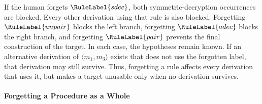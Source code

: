 If the human forgets $\RuleLabel{sdec}$, both symmetric-decryption occurrences are blocked. Every other derivation using that rule is also blocked. Forgetting $\RuleLabel{unpair}$ blocks the left branch, forgetting $\RuleLabel{adec}$ blocks the right branch, and forgetting $\RuleLabel{pair}$ prevents the final construction of the target. In each case, the hypotheses remain known. If an alternative derivation of $\langle m_1,m_3\rangle$ exists that does not use the forgotten label, that derivation may still survive. Thus, forgetting a rule affects every derivation that uses it, but makes a target unusable only when no derivation survives.

\paragraph{Forgetting a Procedure as a Whole}

